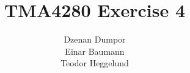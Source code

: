 


\author{Dzenan Dumpor \\ Einar Baumann \\ Teodor Heggelund}
\title{TMA4280 Exercise 4}


\maketitle



